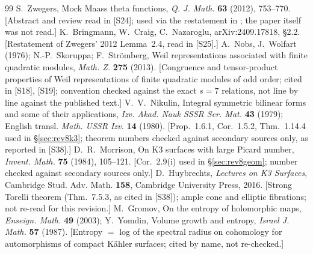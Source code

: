 \documentclass[11pt]{article}
\theoremstyle{definition}
\theoremstyle{plain}
\newcommand{\src}[1]{\textup{[S#1]}}
\begin{document}
\begin{thebibliography}{99}
 S.~Zwegers, Mock Maass theta functions, \emph{Q. J. Math.} \textbf{63} (2012), 753--770. [Abstract and review read in \src{24}; used via the restatement in \cite{BCN}; the paper itself was not read.]
 K.~Bringmann, W.~Craig, C.~Nazaroglu, arXiv:2409.17818, \S2.2. [Restatement of Zwegers' 2012 Lemma~2.4, read in \src{25}.]
 A.~Nobs, J.~Wolfart (1976); N.-P.~Skoruppa; F.~Str\"omberg, Weil representations associated with finite quadratic modules, \emph{Math. Z.} \textbf{275} (2013). [Congruence and tensor-product properties of Weil representations of finite quadratic modules of odd order; cited in \src{18}, \src{19}; convention checked against the exact $s=7$ relations, not line by line against the published text.]
 V.~V.~Nikulin, Integral symmetric bilinear forms and some of their applications, \emph{Izv. Akad. Nauk SSSR Ser. Mat.} \textbf{43} (1979); English transl. \emph{Math. USSR Izv.} \textbf{14} (1980). [Prop.~1.6.1, Cor.~1.5.2, Thm.~1.14.4 used in \S\ref{sec:rev8k3}; theorem numbers checked against secondary sources only, as reported in \src{38}.]
 D.~R.~Morrison, On K3 surfaces with large Picard number, \emph{Invent. Math.} \textbf{75} (1984), 105--121. [Cor.~2.9(i) used in \S\ref{sec:rev8geom}; number checked against secondary sources only.]
 D.~Huybrechts, \emph{Lectures on K3 Surfaces}, Cambridge Stud. Adv. Math. \textbf{158}, Cambridge University Press, 2016. [Strong Torelli theorem (Thm.~7.5.3, as cited in \src{38}); ample cone and elliptic fibrations; not re-read for this revision.]
 M.~Gromov, On the entropy of holomorphic maps, \emph{Enseign. Math.} \textbf{49} (2003); Y.~Yomdin, Volume growth and entropy, \emph{Israel J. Math.} \textbf{57} (1987). [Entropy $=$ log of the spectral radius on cohomology for automorphisms of compact K\"ahler surfaces; cited by name, not re-checked.]
\end{thebibliography}
\end{document}
